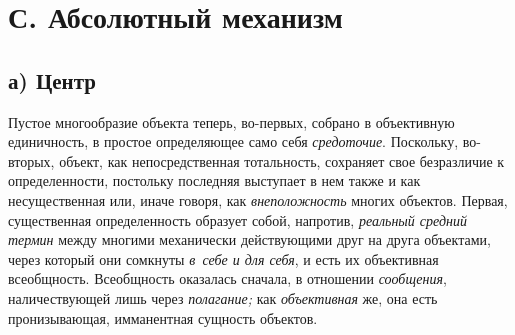 \section[С. Абсолютный механизм]{С. Абсолютный механизм}

\subsection[а) Центр]{а) Центр}

Пустое многообразие объекта теперь, во-первых, собрано в
объективную единичность, в простое определяющее само себя
{\em средоточие}.
Поскольку, во-вторых, объект, как непосредственная
тотальность, сохраняет свое безразличие к определенности, постольку
последняя выступает в нем также и как несущественная или, иначе говоря, как
{\em внеположность}
многих объектов. Первая, существенная определенность образует
собой, напротив, {\em реальный средний
термин} между многими механически действующими друг на друга
объектами, через который они сомкнуты
{\em в~себе и для себя},
и есть их объективная всеобщность. Всеобщность оказалась
сначала, в отношении {\em сообщения},
наличествующей лишь через
{\em полагание;} как
{\em объективная} же, она
есть пронизывающая, имманентная сущность объектов.

